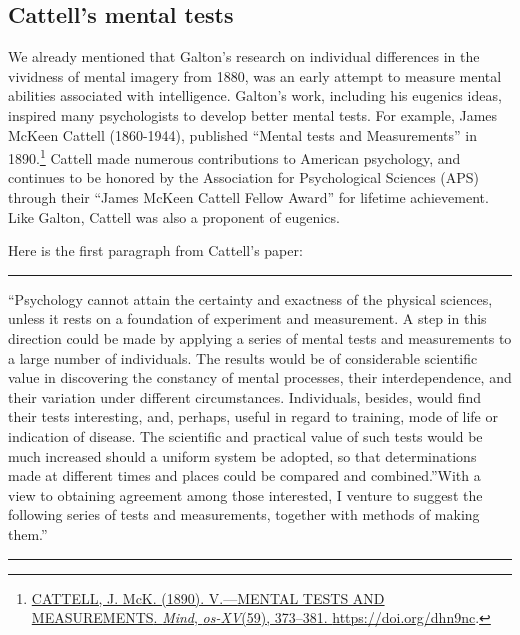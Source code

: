 \documentclass[
  oneside,
  12pt]{crumpbook}
\begin{document}
\hypertarget{cattells-mental-tests}{%
\subsection{Cattell's mental tests}\label{cattells-mental-tests}}

We already mentioned that Galton's research on individual differences in the vividness of mental imagery from 1880, was an early attempt to measure mental abilities associated with intelligence. Galton's work, including his eugenics ideas, inspired many psychologists to develop better mental tests. For example, James McKeen Cattell (1860-1944), published ``Mental tests and Measurements'' in 1890.\footnote{\protect\hyperlink{ref-cattellMENTALTESTSMEASUREMENTS1890}{CATTELL, J. McK. (1890). V.---{MENTAL TESTS AND MEASUREMENTS}. \emph{Mind}, \emph{os-XV}(59), 373--381. \url{https://doi.org/dhn9nc}}.} Cattell made numerous contributions to American psychology, and continues to be honored by the Association for Psychological Sciences (APS) through their ``James McKeen Cattell Fellow Award'' for lifetime achievement. Like Galton, Cattell was also a proponent of eugenics.

Here is the first paragraph from Cattell's paper:

\begin{center}\rule{0.5\linewidth}{0.5pt}\end{center}

``Psychology cannot attain the certainty and exactness of the physical sciences, unless it rests on a foundation of experiment and measurement. A step in this direction could be made by applying a series of mental tests and measurements to a large number of individuals. The results would be of considerable scientific value in discovering the constancy of mental processes, their interdependence, and their variation under different circumstances. Individuals, besides, would find their tests interesting, and, perhaps, useful in regard to training, mode of life or indication of disease. The scientific and practical value of such tests would be much increased should a uniform system be adopted, so that determinations made at different times and places could be compared and combined.''With a view to obtaining agreement among those interested, I venture to suggest the following series of tests and measurements, together with methods of making them.''

\begin{center}\rule{0.5\linewidth}{0.5pt}\end{center}
\end{document}
